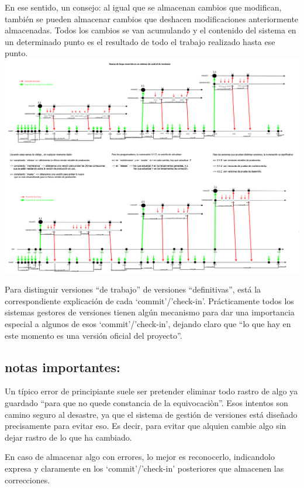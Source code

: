 \documentclass[spanish,12pt,a4paper,final,oneside]{book}
\begin{document}
En ese sentido, un consejo: al igual que se almacenan cambios que modifican, también se pueden almacenar cambios que deshacen modificaciones anteriormente almacenadas. Todos los cambios se van acumulando y el contenido del sistema en un determinado punto es el resultado de todo el trabajo realizado hasta ese punto.
\\
\includegraphics[width=\textwidth]{diversas ramas en un gestor de versiones}
 
Para distinguir versiones ``de trabajo'' de versiones ``definitivas'', está la correspondiente explicación de cada ‘commit’/’check-in’. Prácticamente todos los sistemas gestores de versiones tienen algún mecanismo para dar una importancia especial a algunos de esos  ‘commit’/’check-in’, dejando claro que ``lo que hay en este momento es una versión oficial del proyecto''.

\subsection*{notas importantes:} 
Un  típico error de principiante suele ser pretender eliminar todo rastro de algo ya guardado ``para que no quede constancia de la equivocaciòn''. Esos intentos son camino seguro al desastre, ya que el sistema de gestión de versiones está diseñado precisamente para evitar eso. Es decir, para evitar que alquien cambie algo sin dejar rastro de lo que ha cambiado. 

En caso de almacenar algo con errores, lo mejor es reconocerlo, indicandolo expresa y claramente en los ‘commit’/’check-in’ posteriores que almacenen las correcciones.
\end{document}

